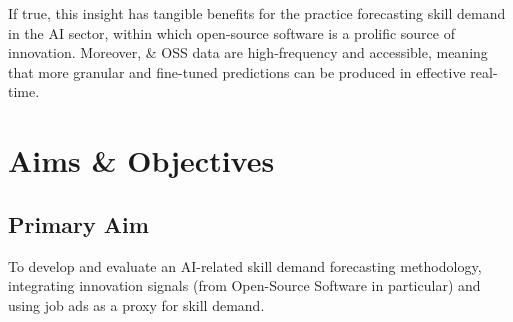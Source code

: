 If true, this insight has tangible benefits for the practice forecasting skill demand in the AI sector, within which open-source software is a prolific source of innovation.
Moreover, \jobposts{} \& OSS data are high-frequency and accessible, meaning that more granular and fine-tuned predictions can be produced in effective real-time.


% 

% 

\section{Aims \& Objectives}

\subsection{Primary Aim}
To develop and evaluate an AI-related skill demand forecasting methodology, integrating innovation signals (from Open-Source Software in particular) and using job ads as a proxy for skill demand.

